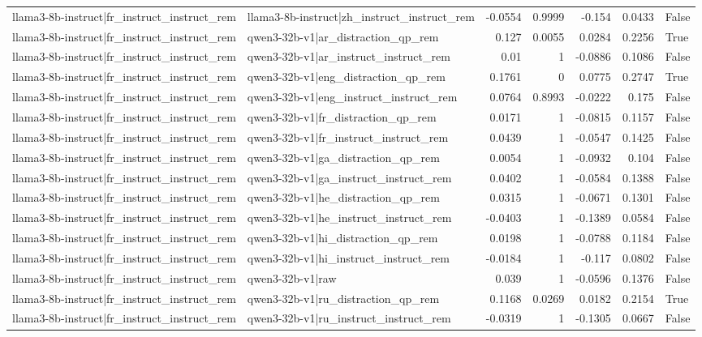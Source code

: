 \begin{table}
\begin{tabular}{l l r r r r l}
llama3-8b-instruct|fr_instruct_instruct_rem & llama3-8b-instruct|zh_instruct_instruct_rem & -0.0554 & 0.9999 & -0.154 & 0.0433 & False \\
llama3-8b-instruct|fr_instruct_instruct_rem & qwen3-32b-v1|ar_distraction_qp_rem & 0.127 & 0.0055 & 0.0284 & 0.2256 & True \\
llama3-8b-instruct|fr_instruct_instruct_rem & qwen3-32b-v1|ar_instruct_instruct_rem & 0.01 & 1 & -0.0886 & 0.1086 & False \\
llama3-8b-instruct|fr_instruct_instruct_rem & qwen3-32b-v1|eng_distraction_qp_rem & 0.1761 & 0 & 0.0775 & 0.2747 & True \\
llama3-8b-instruct|fr_instruct_instruct_rem & qwen3-32b-v1|eng_instruct_instruct_rem & 0.0764 & 0.8993 & -0.0222 & 0.175 & False \\
llama3-8b-instruct|fr_instruct_instruct_rem & qwen3-32b-v1|fr_distraction_qp_rem & 0.0171 & 1 & -0.0815 & 0.1157 & False \\
llama3-8b-instruct|fr_instruct_instruct_rem & qwen3-32b-v1|fr_instruct_instruct_rem & 0.0439 & 1 & -0.0547 & 0.1425 & False \\
llama3-8b-instruct|fr_instruct_instruct_rem & qwen3-32b-v1|ga_distraction_qp_rem & 0.0054 & 1 & -0.0932 & 0.104 & False \\
llama3-8b-instruct|fr_instruct_instruct_rem & qwen3-32b-v1|ga_instruct_instruct_rem & 0.0402 & 1 & -0.0584 & 0.1388 & False \\
llama3-8b-instruct|fr_instruct_instruct_rem & qwen3-32b-v1|he_distraction_qp_rem & 0.0315 & 1 & -0.0671 & 0.1301 & False \\
llama3-8b-instruct|fr_instruct_instruct_rem & qwen3-32b-v1|he_instruct_instruct_rem & -0.0403 & 1 & -0.1389 & 0.0584 & False \\
llama3-8b-instruct|fr_instruct_instruct_rem & qwen3-32b-v1|hi_distraction_qp_rem & 0.0198 & 1 & -0.0788 & 0.1184 & False \\
llama3-8b-instruct|fr_instruct_instruct_rem & qwen3-32b-v1|hi_instruct_instruct_rem & -0.0184 & 1 & -0.117 & 0.0802 & False \\
llama3-8b-instruct|fr_instruct_instruct_rem & qwen3-32b-v1|raw & 0.039 & 1 & -0.0596 & 0.1376 & False \\
llama3-8b-instruct|fr_instruct_instruct_rem & qwen3-32b-v1|ru_distraction_qp_rem & 0.1168 & 0.0269 & 0.0182 & 0.2154 & True \\
llama3-8b-instruct|fr_instruct_instruct_rem & qwen3-32b-v1|ru_instruct_instruct_rem & -0.0319 & 1 & -0.1305 & 0.0667 & False \\

\end{tabular}
\end{table}
